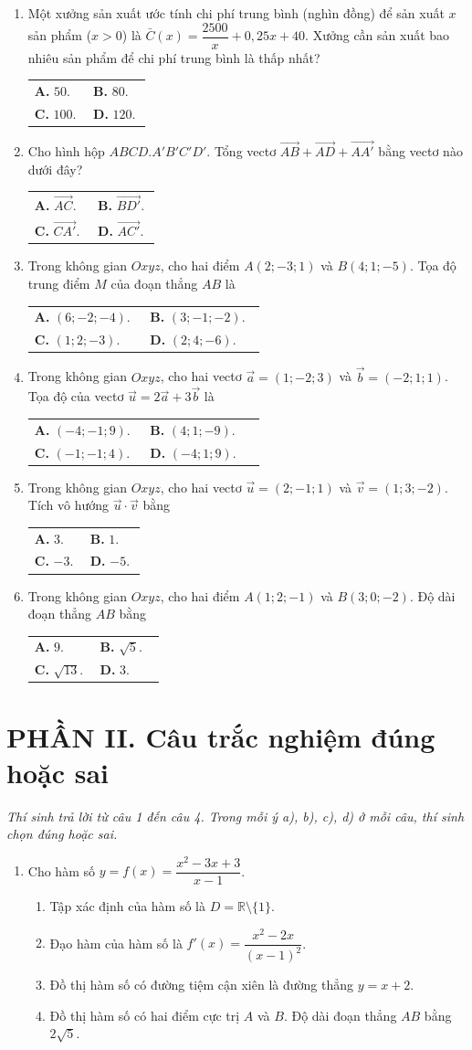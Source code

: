 \documentclass[12pt,a4paper]{article}
\makeatletter
\newcommand{\bonpa}[4]{\par\nobreak\smallskip\nobreak\noindent
\begin{tabular}{@{}p{0.47\linewidth}p{0.47\linewidth}@{}}
\textbf{A.} #1 & \textbf{B.} #2\\[8pt]
\textbf{C.} #3 & \textbf{D.} #4\end{tabular}}
\makeatother
\begin{document}
\newpage
\begin{enumerate}[start=7]
\item Một xưởng sản xuất ước tính chi phí trung bình (nghìn đồng) để sản xuất $x$ sản phẩm ($x>0$) là $\bar{C}(x)=\dfrac{2500}{x}+0{,}25x+40$. Xưởng cần sản xuất bao nhiêu sản phẩm để chi phí trung bình là thấp nhất?
\bonpa{$50$.}{$80$.}{$100$.}{$120$.}

\item Cho hình hộp $ABCD.A'B'C'D'$. Tổng vectơ $\vec{AB}+\vec{AD}+\vec{AA'}$ bằng vectơ nào dưới đây?
\bonpa{$\vec{AC}$.}{$\vec{BD'}$.}{$\vec{CA'}$.}{$\vec{AC'}$.}

\item Trong không gian $Oxyz$, cho hai điểm $A(2;-3;1)$ và $B(4;1;-5)$. Tọa độ trung điểm $M$ của đoạn thẳng $AB$ là
\bonpa{$(6;-2;-4)$.}{$(3;-1;-2)$.}{$(1;2;-3)$.}{$(2;4;-6)$.}

\item Trong không gian $Oxyz$, cho hai vectơ $\vec{a}=(1;-2;3)$ và $\vec{b}=(-2;1;1)$. Tọa độ của vectơ $\vec{u}=2\vec{a}+3\vec{b}$ là
\bonpa{$(-4;-1;9)$.}{$(4;1;-9)$.}{$(-1;-1;4)$.}{$(-4;1;9)$.}

\item Trong không gian $Oxyz$, cho hai vectơ $\vec{u}=(2;-1;1)$ và $\vec{v}=(1;3;-2)$. Tích vô hướng $\vec{u}\cdot\vec{v}$ bằng
\bonpa{$3$.}{$1$.}{$-3$.}{$-5$.}

\item Trong không gian $Oxyz$, cho hai điểm $A(1;2;-1)$ và $B(3;0;-2)$. Độ dài đoạn thẳng $AB$ bằng
\bonpa{$9$.}{$\sqrt{5}$.}{$\sqrt{13}$.}{$3$.}
\end{enumerate}

\vspace{3pt}
\section*{\large PHẦN II. Câu trắc nghiệm đúng hoặc sai}
\textit{Thí sinh trả lời từ câu 1 đến câu 4. Trong mỗi ý a), b), c), d) ở mỗi câu, thí sinh chọn đúng hoặc sai.}
\begin{enumerate}
\item Cho hàm số $y=f(x)=\dfrac{x^2-3x+3}{x-1}$.
\begin{enumerate}
\item Tập xác định của hàm số là $D=\mathbb{R}\setminus\{1\}$.
\item Đạo hàm của hàm số là $f'(x)=\dfrac{x^2-2x}{(x-1)^2}$.
\item Đồ thị hàm số có đường tiệm cận xiên là đường thẳng $y=x+2$.
\item Đồ thị hàm số có hai điểm cực trị $A$ và $B$. Độ dài đoạn thẳng $AB$ bằng $2\sqrt{5}$.
\end{enumerate}
\end{enumerate}
\end{document}

